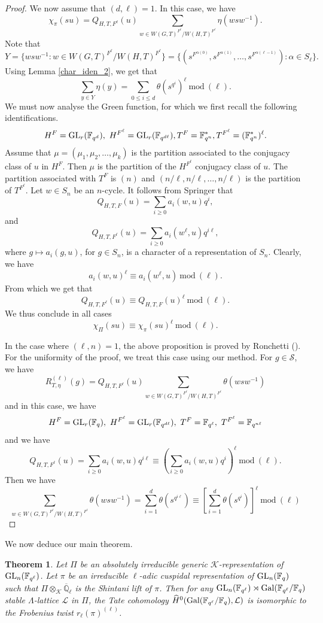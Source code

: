\documentclass[10pt, reqno]{amsart}
\theoremstyle{plain}
\numberwithin{equation}{section} \newcommand{\di}{\operatorname{dim}}
\newtheorem{theorem}{Theorem}[subsection]
\begin{document}
\begin{proof}
We now assume that $(d, \ell)=1$. In this case, we have 
$$\chi_{\pi}(su)=Q_{H, T,F^\ell}(u)\sum_{w\in W(G, T)^{F^\ell}/W(H, T)^{F^\ell}}\eta(wsw^{-1}).$$
Note that 
$$Y=\{wsw^{-1}:w\in W(G, T)^{F^\ell}/W(H, T)^{F^\ell}\}=
\{(s^{F^{\alpha(0)}}, s^{F^{\alpha(1)}},\dots, 
s^{F^{\alpha(\ell-1)}}) : \alpha\in S_\ell\}.
$$
Using Lemma \ref{char_iden_2}, we get that 
$$\sum_{y\in Y}\eta(y)=\sum_{0\leq i\leq d}\theta(s^{q^i})^\ell\ \text{mod}\ (\ell).$$
We must now analyse the Green function, for which we first recall the following 
identifications. 
$$H^F={\rm GL}_r(\mathbb{F}_{q^d}), \ H^{F^\ell}={\rm
  GL}_{r}(\mathbb{F}_{q^{d\ell}}), T^F =\mathbb{F}_{q^n}^\ast,
T^{F^\ell}=(\mathbb{F}_{q^n}^\ast)^\ell.$$ Assume that
$\mu=(\mu_1, \mu_2,\dots, \mu_k)$ is the partition associated to the
conjugacy class of $u$ in $H^F$. Then $\mu$ is the partition of the
$H^{F^\ell}$ conjugacy class of $u$. The partition associated with
$T^F$ is $(n)$ and $(n/\ell, n/\ell,\dots, n/\ell)$ is the partition
of $T^{F^\ell}$.  Let $w\in S_n$ be an $n$-cycle. It follows from
Springer that
$$Q_{H, T, F}(u)=\sum_{i\geq 0}a_i(w, u)q^i,$$
and 
$$Q_{H, T, F^\ell}(u)=\sum_{i\geq 0}a_i(w^\ell, u)q^{i\ell},$$
where $g\mapsto a_i(g, u)$, for $g\in S_n$, is a character of a representation of 
$S_n$. Clearly, we have 
$$a_i(w, u)^\ell\equiv a_i(w^\ell, u)\ \text{mod}\ (\ell).$$
From which we get that
$$Q_{H, T, F^\ell}(u)\equiv Q_{H, T, F}(u)^\ell\ \text{mod}\ (\ell).$$
We thus conclude in all cases 
$$\chi_{\Pi}(su)\equiv \chi_\pi(su)^\ell\ \text{mod}\ (\ell).$$

In the case where $(\ell, n)=1$, the above proposition is proved by
Ronchetti (\cite[Theorem 13]{Ronchetti_BC}). For the uniformity of the
proof, we treat this case using our method. For $g\in \mathcal{S}$, we
have
$$R_{T, \eta}^{(\ell)}(g)=Q_{H, T, F^\ell}(u)
\sum_{w\in W(G, T)^{F^\ell}/W(H, T)^{F^\ell}}\theta(wsw^{-1})$$
and in this case, we have 
$$H^F={\rm GL}_r(\mathbb{F}_q),\ 
H^{F^\ell}={\rm GL}_r(\mathbb{F}_{q^{d\ell}}),\ 
T^F=\mathbb{F}_{q^\ell},\ T^{F^\ell}=\mathbb{F}_{q^{n\ell}}$$
and we have 
$$Q_{H, T, F^\ell}(u)=\sum_{i\geq 0}a_i(w, u)q^{i\ell}\equiv 
(\sum_{i\geq 0}a_i(w, u)q^i)^\ell\ \text{mod}\ (\ell).$$
Then we have 
$$\sum_{w\in W(G, T)^{F^\ell}/W(H, T)^{F^\ell}}
\theta(wsw^{-1})=
\sum_{i=1}^{d}\theta(s^{q^{i\ell}})\equiv 
[\sum_{i=1}^d\theta(s^{q^i})]^\ell\ \text{mod}\ (\ell)$$ 
\end{proof}
We now deduce our main theorem.
\begin{theorem}\label{TV_finite_field}
  Let $\Pi$ be an absolutely irreducible generic
  $\mathcal{K}$-representation of ${\rm
    GL}_n(\mathbb{F}_{q^\ell})$. Let $\pi$ be an irreducible
  $\ell$-adic cuspidal representation of ${\rm GL}_n(\mathbb{F}_q)$
  such that $\Pi\otimes_{\mathcal{K}} \overline{\mathbb{Q}}_\ell$ is
  the Shintani lift of $\pi$.  Then for any
  ${\rm GL}_n(\mathbb{F}_{q^\ell})\rtimes {\rm
    Gal}(\mathbb{F}_{q^\ell}/\mathbb{F}_q)$ stable $\Lambda$-lattice
  $\mathcal{L}$ in $\Pi$, the Tate cohomology
  $\widehat{H}^0({\rm
    Gal}(\mathbb{F}_{q^\ell}/\mathbb{F}_q),\mathcal{L})$ is isomorphic
  to the Frobenius twist $r_\ell(\pi)^{(\ell)}$.
\end{theorem}
\end{document}
